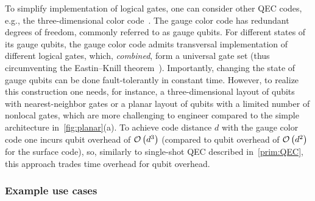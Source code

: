 \begin{refsection}
To simplify implementation of logical gates, one can consider other QEC codes, e.g., the three-dimensional color code~\cite{bombin2015gaugeColorCodes,kubica2015universalTransversalGates}.
The gauge color code has redundant degrees of freedom, commonly referred to as gauge qubits. 
For different states of its gauge qubits, the gauge color code admits transversal implementation of different logical gates, which, \emph{combined}, form a universal gate set (thus circumventing the Eastin--Knill theorem~\cite{eastin2009RestrictionsTransversal,zeng2011Transversality}).
Importantly, changing the state of gauge qubits can be done fault-tolerantly in constant time.
However, to realize this construction one needs, for instance, a three-dimensional layout of qubits with nearest-neighbor gates or a planar layout of qubits with a limited number of nonlocal gates, which are more challenging to engineer compared to the simple architecture in~\cref{fig:planar}(a).
To achieve code distance $d$ with the gauge color code one incurs qubit overhead of $\mathcal{O}\left( d^3 \right)$ (compared to qubit overhead of $\mathcal{O}\left( d^2 \right)$ for the surface code), so, similarly to single-shot QEC described in~\cref{prim:QEC}, this approach trades time overhead for qubit overhead. 



\subsubsection*{Example use cases}



\end{refsection}
